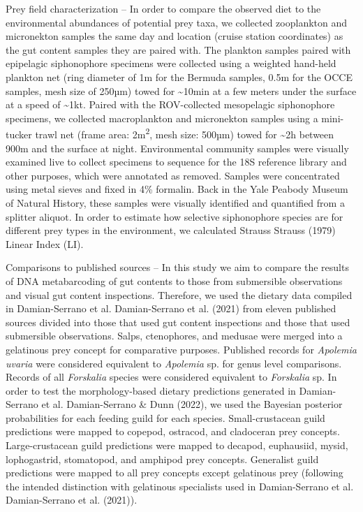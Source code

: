 \documentclass[12pt,]{article}
\begin{document}
Prey field characterization -- In order to compare the observed diet to the environmental abundances of potential prey taxa, we collected zooplankton and micronekton samples the same day and location (cruise station coordinates) as the gut content samples they are paired with. The plankton samples paired with epipelagic siphonophore specimens were collected using a weighted hand-held plankton net (ring diameter of 1m for the Bermuda samples, 0.5m for the OCCE samples, mesh size of 250µm) towed for \textasciitilde{}10min at a few meters under the surface at a speed of \textasciitilde{}1kt. Paired with the ROV-collected mesopelagic siphonophore specimens, we collected macroplankton and micronekton samples using a mini-tucker trawl net (frame area: 2m\textsuperscript{2}, mesh size: 500µm) towed for \textasciitilde{}2h between 900m and the surface at night. Environmental community samples were visually examined live to collect specimens to sequence for the 18S reference library and other purposes, which were annotated as removed. Samples were concentrated using metal sieves and fixed in 4\% formalin. Back in the Yale Peabody Museum of Natural History, these samples were visually identified and quantified from a splitter aliquot. In order to estimate how selective siphonophore species are for different prey types in the environment, we calculated Strauss Strauss (1979) Linear Index (LI).

Comparisons to published sources -- In this study we aim to compare the results of DNA metabarcoding of gut contents to those from submersible observations and visual gut content inspections. Therefore, we used the dietary data compiled in Damian-Serrano et al. Damian-Serrano et al. (2021) from eleven published sources divided into those that used gut content inspections and those that used submersible observations. Salps, ctenophores, and medusae were merged into a gelatinous prey concept for comparative purposes. Published records for \emph{Apolemia uvaria} were considered equivalent to \emph{Apolemia} sp. for genus level comparisons. Records of all \emph{Forskalia} species were considered equivalent to \emph{Forskalia} sp. In order to test the morphology-based dietary predictions generated in Damian-Serrano et al. Damian-Serrano \& Dunn (2022), we used the Bayesian posterior probabilities for each feeding guild for each species. Small-crustacean guild predictions were mapped to copepod, ostracod, and cladoceran prey concepts. Large-crustacean guild predictions were mapped to decapod, euphausiid, mysid, lophogastrid, stomatopod, and amphipod prey concepts. Generalist guild predictions were mapped to all prey concepts except gelatinous prey (following the intended distinction with gelatinous specialists used in Damian-Serrano et al. Damian-Serrano et al. (2021)).
\end{document}
